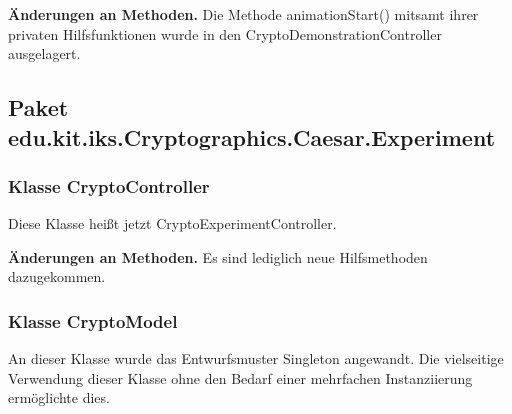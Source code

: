 \documentclass{article}
\begin{document}
	    \textbf{Änderungen an Methoden.}\newline
	     Die Methode animationStart() mitsamt ihrer privaten Hilfsfunktionen wurde in den CryptoDemonstrationController ausgelagert.

  \subsection{Paket edu.kit.iks.Cryptographics.Caesar.Experiment}

	\subsubsection{Klasse CryptoController}
          Diese Klasse heißt jetzt CryptoExperimentController.\newline
          
          \textbf{Änderungen an Methoden.}\newline
           Es sind lediglich neue Hilfsmethoden dazugekommen.
	\subsubsection{Klasse CryptoModel}
	 An dieser Klasse wurde das Entwurfsmuster Singleton angewandt. Die vielseitige Verwendung dieser Klasse 
	 ohne den Bedarf einer mehrfachen Instanziierung ermöglichte dies.\newline 
	 
\end{document}
